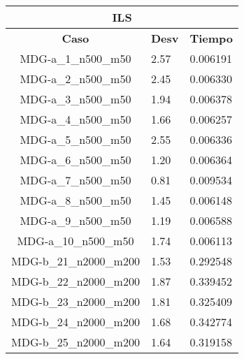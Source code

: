 \documentclass[10pt,a4paper]{article}
\begin{document}
\begin{table}[]
	\centering
	\begin{tabular}{|c|l|l|}
		\hline
		\multicolumn{3}{|c|}{\textbf{ILS}}                                                                 \\ \hline
		\textbf{Caso}          & \multicolumn{1}{c|}{\textbf{Desv}} & \multicolumn{1}{c|}{\textbf{Tiempo}} \\ \hline
		MDG-a\_1\_n500\_m50    & 2.57                               & 0.006191                             \\ \hline
		MDG-a\_2\_n500\_m50    & 2.45                               & 0.006330                             \\ \hline
		MDG-a\_3\_n500\_m50    & 1.94                               & 0.006378                             \\ \hline
		MDG-a\_4\_n500\_m50    & 1.66                               & 0.006257                             \\ \hline
		MDG-a\_5\_n500\_m50    & 2.55                               & 0.006336                             \\ \hline
		MDG-a\_6\_n500\_m50    & 1.20                               & 0.006364                             \\ \hline
		MDG-a\_7\_n500\_m50    & 0.81                               & 0.009534                             \\ \hline
		MDG-a\_8\_n500\_m50    & 1.45                               & 0.006148                             \\ \hline
		MDG-a\_9\_n500\_m50    & 1.19                               & 0.006588                             \\ \hline
		MDG-a\_10\_n500\_m50   & 1.74                               & 0.006113                             \\ \hline
		MDG-b\_21\_n2000\_m200 & 1.53                               & 0.292548                             \\ \hline
		MDG-b\_22\_n2000\_m200 & 1.87                               & 0.339452                             \\ \hline
		MDG-b\_23\_n2000\_m200 & 1.81                               & 0.325409                             \\ \hline
		MDG-b\_24\_n2000\_m200 & 1.68                               & 0.342774                             \\ \hline
		MDG-b\_25\_n2000\_m200 & 1.64                               & 0.319158                             \\ \hline

\end{tabular}
\end{table}
\end{document}
